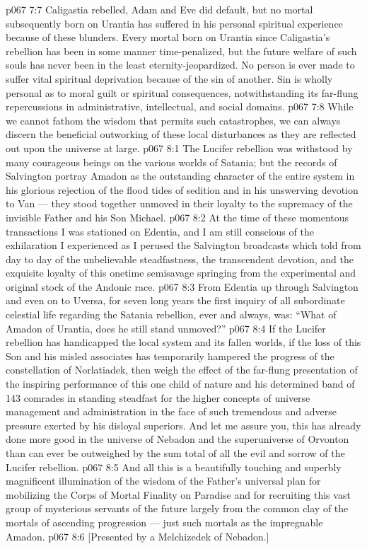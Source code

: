 \vs p067 7:7 Caligastia rebelled, Adam and Eve did default, but no mortal subsequently born on Urantia has suffered in his personal spiritual experience because of these blunders. Every mortal born on Urantia since Caligastia’s rebellion has been in some manner time\hyp{}penalized, but the future welfare of such souls has never been in the least eternity\hyp{}jeopardized. No person is ever made to suffer vital spiritual deprivation because of the sin of another. Sin is wholly personal as to moral guilt or spiritual consequences, notwithstanding its far\hyp{}flung repercussions in administrative, intellectual, and social domains.
\vs p067 7:8 \pc While we cannot fathom the wisdom that permits such catastrophes, we can always discern the beneficial outworking of these local disturbances as they are reflected out upon the universe at large.
\vs p067 8:1 The Lucifer rebellion was withstood by many courageous beings on the various worlds of Satania; but the records of Salvington portray Amadon as the outstanding character of the entire system in his glorious rejection of the flood tides of sedition and in his unswerving devotion to Van --- they stood together unmoved in their loyalty to the supremacy of the invisible Father and his Son Michael.
\vs p067 8:2 At the time of these momentous transactions I was stationed on Edentia, and I am still conscious of the exhilaration I experienced as I perused the Salvington broadcasts which told from day to day of the unbelievable steadfastness, the transcendent devotion, and the exquisite loyalty of this onetime semisavage springing from the experimental and original stock of the Andonic race.
\vs p067 8:3 From Edentia up through Salvington and even on to Uversa, for seven long years the first inquiry of all subordinate celestial life regarding the Satania rebellion, ever and always, was: “What of Amadon of Urantia, does he still stand unmoved?”
\vs p067 8:4 If the Lucifer rebellion has handicapped the local system and its fallen worlds, if the loss of this Son and his misled associates has temporarily hampered the progress of the constellation of Norlatiadek, then weigh the effect of the far\hyp{}flung presentation of the inspiring performance of this one child of nature and his determined band of 143 comrades in standing steadfast for the higher concepts of universe management and administration in the face of such tremendous and adverse pressure exerted by his disloyal superiors. And let me assure you, this has already done more good in the universe of Nebadon and the superuniverse of Orvonton than can ever be outweighed by the sum total of all the evil and sorrow of the Lucifer rebellion.
\vs p067 8:5 And all this is a beautifully touching and superbly magnificent illumination of the wisdom of the Father’s universal plan for mobilizing the Corps of Mortal Finality on Paradise and for recruiting this vast group of mysterious servants of the future largely from the common clay of the mortals of ascending progression --- just such mortals as the impregnable Amadon.
\vsetoff
\vs p067 8:6 [Presented by a Melchizedek of Nebadon.]
